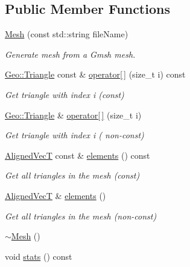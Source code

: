 \subsection*{Public Member Functions}
\begin{DoxyCompactItemize}
\item 
\hyperlink{classTspeed_1_1Mesh_a2359bc61d5acea3515e31b5b3a9d1edf}{Mesh} (const std\-::string file\-Name)
\begin{DoxyCompactList}\small\item\em Generate mesh from a Gmsh mesh. \end{DoxyCompactList}\item 
\hyperlink{classTspeed_1_1Geo_1_1Triangle}{Geo\-::\-Triangle} const \& \hyperlink{classTspeed_1_1Mesh_a20ac8fd5940e93ec902f343211100d78}{operator\mbox{[}$\,$\mbox{]}} (size\-\_\-t i) const 
\begin{DoxyCompactList}\small\item\em Get triangle with index i (const) \end{DoxyCompactList}\item 
\hyperlink{classTspeed_1_1Geo_1_1Triangle}{Geo\-::\-Triangle} \& \hyperlink{classTspeed_1_1Mesh_af6688d1a47cee1baf69ea6d38d721a4a}{operator\mbox{[}$\,$\mbox{]}} (size\-\_\-t i)
\begin{DoxyCompactList}\small\item\em Get triangle with index i ( non-\/const) \end{DoxyCompactList}\item 
\hyperlink{classTspeed_1_1Mesh_ae62a59eea301689dd9f7c9663414db18}{Aligned\-Vec\-T} const \& \hyperlink{classTspeed_1_1Mesh_ac889d7a89a2d98e84dbc9f0f1b2ebb45}{elements} () const 
\begin{DoxyCompactList}\small\item\em Get all triangles in the mesh (const) \end{DoxyCompactList}\item 
\hyperlink{classTspeed_1_1Mesh_ae62a59eea301689dd9f7c9663414db18}{Aligned\-Vec\-T} \& \hyperlink{classTspeed_1_1Mesh_a0e9102ce786fc8c4cda93c4b012c8668}{elements} ()
\begin{DoxyCompactList}\small\item\em Get all triangles in the mesh (non-\/const) \end{DoxyCompactList}\item 
\hyperlink{classTspeed_1_1Mesh_ae4422add9d3952fe2c02f62053ec120f}{$\sim$\-Mesh} ()
\item 
void \hyperlink{classTspeed_1_1Mesh_a10b24b91186b9905847232e7e14d4b2e}{stats} () const 

\end{DoxyCompactItemize}
